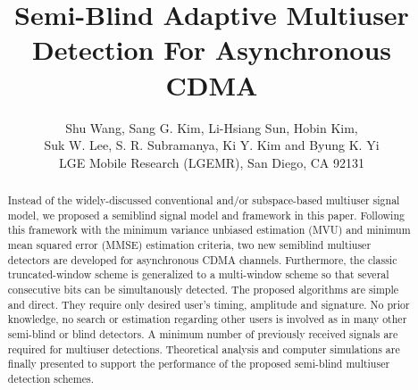 \documentclass[a4paper,10pt,fleqn, twocolumn]{IEEETran}
\title{ Semi-Blind Adaptive Multiuser Detection For Asynchronous CDMA }
\date{}
\author{Shu Wang, Sang G. Kim, Li-Hsiang Sun, Hobin Kim,\\
   Suk W. Lee, S. R. Subramanya, Ki Y. Kim and Byung K. Yi\\LGE Mobile Research (LGEMR), San Diego, CA 92131}
\begin{document}
\maketitle

\begin{abstract}\small
Instead of the widely-discussed conventional and/or subspace-based
multiuser signal model, we proposed a semiblind signal model and
framework in this paper. Following this framework with the minimum
variance unbiased estimation (MVU) and minimum mean squared error
(MMSE) estimation criteria, two new semiblind multiuser detectors
are developed for asynchronous CDMA channels. Furthermore, the
classic truncated-window scheme is generalized to a multi-window
scheme so that several consecutive bits can be simultanously
detected. The proposed algorithms are simple and direct. They
require only desired user's timing, amplitude and signature. No
prior knowledge, no search or estimation regarding other users is
involved as in many other semi-blind or blind detectors. A minimum
number of previously received signals are required for multiuser
detections. Theoretical analysis and computer simulations are
finally presented to support the performance of the proposed
semi-blind multiuser detection schemes.
\end{abstract}
\end{document}
